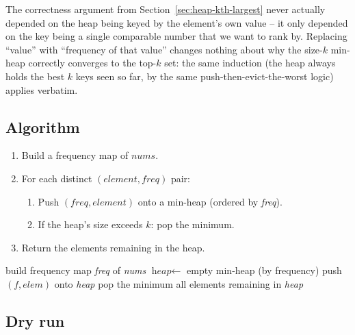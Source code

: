 The correctness argument from Section~\ref{sec:heap-kth-largest} never
actually depended on the heap being keyed by the element's own value --
it only depended on the key being a single comparable number that we want
to rank by. Replacing ``value'' with ``frequency of that value'' changes
nothing about why the size-$k$ min-heap correctly converges to the top-$k$
set: the same induction (the heap always holds the best $k$ keys seen so
far, by the same push-then-evict-the-worst logic) applies verbatim.

\subsection*{Algorithm}

\begin{enumerate}
  \item Build a frequency map of $\textit{nums}$.
  \item For each distinct $(\textit{element}, \textit{freq})$ pair:
  \begin{enumerate}
    \item Push $(\textit{freq}, \textit{element})$ onto a min-heap
          (ordered by \textit{freq}).
    \item If the heap's size exceeds $k$: pop the minimum.
  \end{enumerate}
  \item Return the elements remaining in the heap.
\end{enumerate}

\begin{algorithm}[H]
\caption{Top K Frequent Elements}
\begin{algorithmic}[1]
  \State build frequency map \textit{freq} of \textit{nums}
  \State $\textit{heap} \gets$ empty min-heap (by frequency)
    \State push $(f, \textit{elem})$ onto \textit{heap}
     pop the minimum \EndIf
  \EndFor
  \State \Return all elements remaining in \textit{heap}
\EndProcedure
\end{algorithmic}
\end{algorithm}

\subsection*{Dry run}


